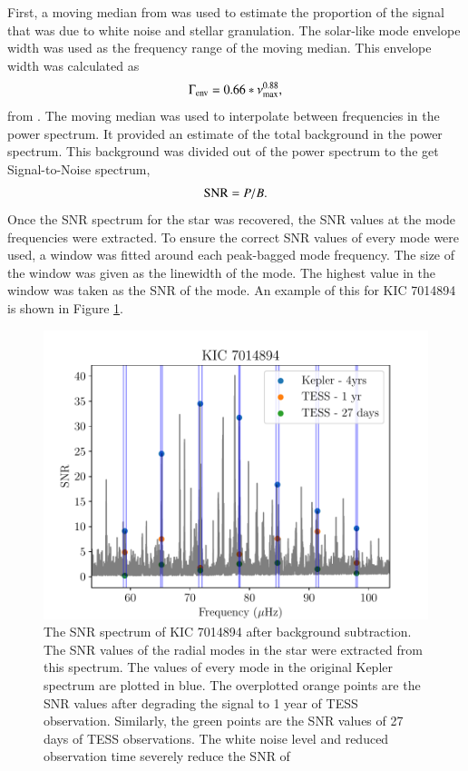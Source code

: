 \documentclass[a4paper,fleqn,usenatbib,useAMS]{mnras}
\newcommand{\numax}{\ensuremath{\nu_{\textrm{max}}}}
\begin{document}
First, a moving median from \citet{davies_asteroseismology_2016} was used to estimate the proportion of the signal that was due to white noise and stellar granulation. The solar-like mode envelope width was used as the frequency range of the moving median. This envelope width was calculated as
\begin{equation}
\Gamma_{\rm env} = 0.66 * \numax^{0.88},
\end{equation}
from \citet{mosser_characterization_2012}. The moving median was used to interpolate between frequencies in the power spectrum. It provided an estimate of the total background in the power spectrum. This background was divided out of the power spectrum to the get Signal-to-Noise spectrum,
\begin{equation}
\label{eq:snr}
{\rm SNR} = P/B.
\end{equation}
Once the SNR spectrum for the star was recovered, the SNR values at the mode frequencies were extracted. To ensure the correct SNR values of every mode were used, a window was fitted around each peak-bagged mode frequency. The size of the window was given as the linewidth of the mode. The highest value in the window was taken as the SNR of the mode. An example of this for KIC 7014894 is shown in Figure \ref{snr}.
\begin{figure}
	\centering
	\includegraphics[scale=0.6]{plot4_SNR7014894.pdf}
	\caption{The SNR spectrum of KIC 7014894 after background subtraction. The SNR values of the radial modes in the star were extracted from this spectrum. The values of every mode in the original Kepler spectrum are plotted in blue. The overplotted orange points are the SNR values after degrading the signal to 1 year of TESS observation. Similarly, the green points are the SNR values of 27 days of TESS observations. The white noise level and reduced observation time severely reduce the SNR of }	
	\label{snr}
\end{figure}
\end{document}
